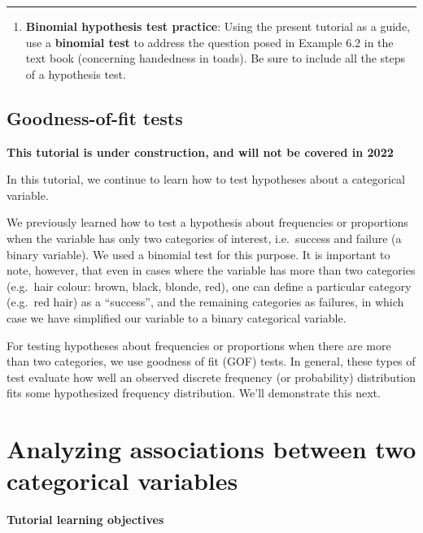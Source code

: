 \documentclass[
]{book}
\providecommand{\tightlist}{%
  \setlength{\itemsep}{0pt}\setlength{\parskip}{0pt}}
\begin{document}
\begin{center}\rule{0.5\linewidth}{0.5pt}\end{center}

\begin{enumerate}
\def\labelenumi{\arabic{enumi}.}
\tightlist
\item
  \textbf{Binomial hypothesis test practice}: Using the present tutorial as a guide, use a \textbf{binomial test} to address the question posed in Example 6.2 in the text book (concerning handedness in toads). Be sure to include all the steps of a hypothesis test.
\end{enumerate}

\section{Goodness-of-fit tests}\label{GOF_test}

\textbf{This tutorial is under construction, and will not be covered in 2022}

In this tutorial, we continue to learn how to test hypotheses about a categorical variable.

We previously learned how to test a hypothesis about frequencies or proportions when the variable has only two categories of interest, i.e.~success and failure (a binary variable). We used a binomial test for this purpose. It is important to note, however, that even in cases where the variable has more than two categories (e.g.~hair colour: brown, black, blonde, red), one can define a particular category (e.g.~red hair) as a ``success'', and the remaining categories as failures, in which case we have simplified our variable to a binary categorical variable.

For testing hypotheses about frequencies or proportions when there are more than two categories, we use goodness of fit (GOF) tests. In general, these types of test evaluate how well an observed discrete frequency (or probability) distribution fits some hypothesized frequency distribution. We'll demonstrate this next.

\chapter{Analyzing associations between two categorical variables}\label{two_cat}

\textbf{Tutorial learning objectives}
\end{document}
